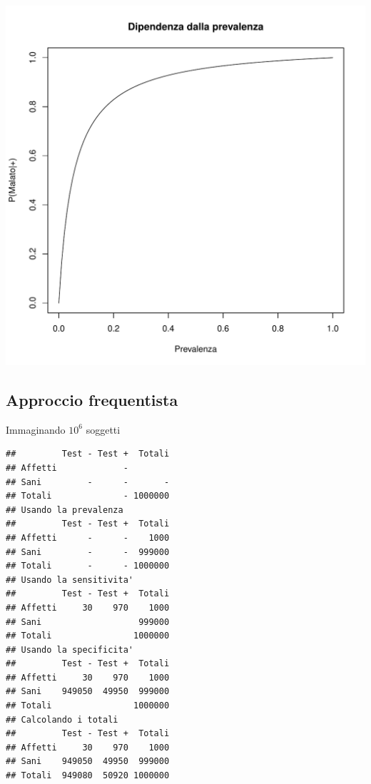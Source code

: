 \documentclass[onecolumn,12pt]{book}\usepackage[]{graphicx}\usepackage[]{color}
\makeatletter
\def\maxwidth{ %
  \ifdim\Gin@nat@width>\linewidth
    \linewidth
  \else
    \Gin@nat@width
  \fi
}
\newenvironment{kframe}{%
 \def\at@end@of@kframe{}%
 \ifinner\ifhmode%
  \def\at@end@of@kframe{\end{minipage}}%
  \begin{minipage}{\columnwidth}%
 \fi\fi%
 \def\FrameCommand##1{\hskip\@totalleftmargin \hskip-\fboxsep
 \colorbox{shadecolor}{##1}\hskip-\fboxsep
     \hskip-\linewidth \hskip-\@totalleftmargin \hskip\columnwidth}%
 \MakeFramed {\advance\hsize-\width
   \@totalleftmargin\z@ \linewidth\hsize
   \@setminipage}}%
 {\par\unskip\endMakeFramed%
 \at@end@of@kframe}
\newenvironment{knitrout}{}{} %
\makeatother
\begin{document}
\begin{knitrout}
\color{fgcolor}
\includegraphics[width=\maxwidth]{figure/unnamed-chunk-24-1} 

\end{knitrout}



\subsection{Approccio frequentista}
Immaginando $10^6$ soggetti

\begin{knitrout}
\color{fgcolor}\begin{kframe}
\begin{verbatim}
##         Test - Test +  Totali
## Affetti             -        
## Sani         -      -       -
## Totali              - 1000000
## Usando la prevalenza
##         Test - Test +  Totali
## Affetti      -      -    1000
## Sani         -      -  999000
## Totali       -      - 1000000
## Usando la sensitivita'
##         Test - Test +  Totali
## Affetti     30    970    1000
## Sani                   999000
## Totali                1000000
## Usando la specificita'
##         Test - Test +  Totali
## Affetti     30    970    1000
## Sani    949050  49950  999000
## Totali                1000000
## Calcolando i totali
##         Test - Test +  Totali
## Affetti     30    970    1000
## Sani    949050  49950  999000
## Totali  949080  50920 1000000
\end{verbatim}
\end{kframe}
\end{knitrout}
\end{document}
